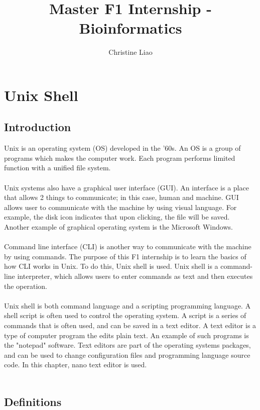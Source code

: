 \documentclass{article}
\title{\huge\textbf{Master F1 Internship - Bioinformatics}}
\author{\LARGE Christine Liao}
\date{\parbox{\linewidth}{\centering%
  \today \endgraf
  \bigskip
  \vspace{10cm}
  \LARGE Supervisor:\ Dr. Konrad F\"orstner \endgraf
  Core Unit Systems Medicine\endgraf
  Julius Maximilian University - W\"urzburg}}
\begin{document}
\maketitle
\newpage
  \tableofcontents
\newpage  
{}



\section{Unix Shell}
\subsection{Introduction}
Unix is an operating system (OS) developed in the '60s. An OS is a group of programs which makes the computer work. Each program performs limited function with a unified file system.\\
\\
Unix systems also have a graphical user interface (GUI). An interface is a place that allows 2 things to communicate; in this case, human and machine. GUI allows user to communicate with the machine by using visual language. For example, the disk icon indicates that upon clicking, the file will be saved. Another example of graphical operating system is the Microsoft Windows.\\
\\
Command line interface (CLI) is another way to communicate with the machine by using commands. The purpose of this F1 internship is to learn the basics of how CLI works in Unix. To do this, Unix shell is used. Unix shell is a command-line interpreter, which allows users to enter commands as text and then executes the operation.\\
\\
Unix shell is both command language and a scripting programming language. A shell script is often used to control the operating system. A script is a series of commands that is often used, and can be saved in a text editor. A text editor is a type of computer program the edits plain text. An example of such programs is the "notepad" software. Text editors are part of the operating systems packages, and can be used to change configuration files and programming language source code. In this chapter, nano text editor is used. \\
\\


\subsection{\textbf{Definitions}}
\end{document}
